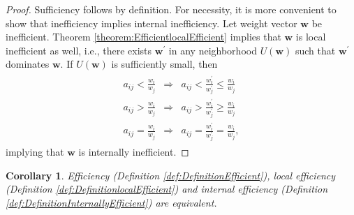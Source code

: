\documentclass{article}
\theoremstyle{plain}
\newtheorem{corollary}{Corollary}
\begin{document}
\begin{proof}
Suf{\kern0pt}f{\kern0pt}iciency follows by def{\kern0pt}inition. For necessity, it is more
convenient to show that inef{\kern0pt}f{\kern0pt}iciency implies internal inef{\kern0pt}f{\kern0pt}iciency.
Let weight vector $\mathbf{w}$ be inef{\kern0pt}f{\kern0pt}icient.
Theorem \ref{theorem:EfficientlocalEfficient} implies that
$\mathbf{w}$ is local inef{\kern0pt}f{\kern0pt}icient as well, i.e.,
there exists $\mathbf{w^{\prime}}$ in any neighborhood $U(\mathbf{w})$
such that $\mathbf{w^{\prime}}$ dominates $\mathbf{w}.$
If $U(\mathbf{w})$ is suf{\kern0pt}f{\kern0pt}iciently small, then
\begin{align} \label{eq:wprimedominatesw} %
\begin{array}{ccc}
a_{ij} < \frac{w_i}{w_j} & \Longrightarrow &
a_{ij} < \frac{w^{\prime}_i}{w^{\prime}_j} \leq \frac{w_i}{w_j} \\[2mm]
a_{ij} > \frac{w_i}{w_j} & \Longrightarrow &
a_{ij} > \frac{w^{\prime}_i}{w^{\prime}_j} \geq \frac{w_i}{w_j} \\[2mm]
a_{ij} = \frac{w_i}{w_j} & \Longrightarrow &
a_{ij} = \frac{w^{\prime}_i}{w^{\prime}_j} = \frac{w_i}{w_j},
\end{array}
\end{align}
implying that $\mathbf{w}$ is internally inef{\kern0pt}f{\kern0pt}icient.
\end{proof}

\begin{corollary} \label{corollary:EfficiencyDefinitionsAreEquivalent}
Ef{\kern0pt}f{\kern0pt}iciency (Def{\kern0pt}inition \ref{def:DefinitionEfficient}),
local ef{\kern0pt}f{\kern0pt}iciency (Def{\kern0pt}inition \ref{def:DefinitionlocalEfficient}) and
internal ef{\kern0pt}f{\kern0pt}iciency (Def{\kern0pt}inition \ref{def:DefinitionInternallyEfficient}) are equivalent.
\end{corollary}
\end{document}
